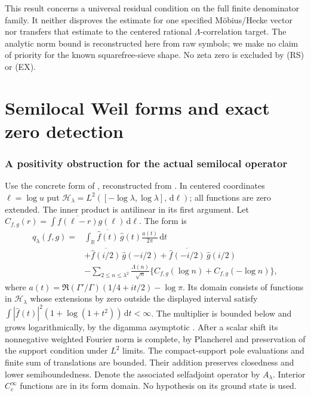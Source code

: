 \documentclass[11pt]{article}
\theoremstyle{remark}\newtheorem{remark}[theorem]{Remark}
\newcommand{\R}{\mathbb R}
\newcommand{\dd}{\,\mathrm d}
\begin{document}
This result concerns a universal residual condition on the full
finite denominator family. It neither disproves the estimate for
one specified M\"obius/Hecke vector nor transfers that estimate
to the centered rational $\Lambda$-correlation target.
The analytic norm bound is reconstructed here from raw symbols;
we make no claim of priority for the known squarefree-sieve
shape. No zeta zero is excluded by (RS) or (EX).

\part{Semilocal Weil forms and exact zero detection}

\section{A positivity obstruction for the actual semilocal operator}
Use the concrete form of \cite[\S3, eqs.~(3.2)--(3.5)]{OperatorSource},
reconstructed from \cite[Proposition 2.1 and Corollary 2.4]{ConnesConsani}.
In centered coordinates $\ell=\log u$ put
$\mathcal H_\lambda=L^2([-\log\lambda,\log\lambda],\dd\ell)$;
all functions are zero extended. The inner product is
antilinear in its first argument. Let
$C_{f,g}(r)=\int\overline{f(\ell-r)}g(\ell)\dd\ell$.
The form is
\begin{align*}
 q_\lambda(f,g)={}&
 \int_{\R}\overline{\widehat f(t)}\,\widehat g(t)
       \frac{a(t)}{2\pi}\dd t\\
 &+\overline{\widehat f(i/2)}\,\widehat g(-i/2)
       +\overline{\widehat f(-i/2)}\,\widehat g(i/2)\\
 &-\sum_{2\le n\le\lambda^2}\frac{\Lambda(n)}{\sqrt n}
       \{C_{f,g}(\log n)+C_{f,g}(-\log n)\},
\end{align*}
where $a(t)=\Re(\Gamma'/\Gamma)(1/4+it/2)-\log\pi$.
Its domain consists of functions in $\mathcal H_\lambda$
whose extensions by zero outside the displayed interval satisfy
$\int|\widehat f(t)|^2(1+\log(1+t^2))\dd t<\infty$.
The multiplier is bounded below and grows logarithmically,
by the digamma asymptotic \cite[eq.~(5.11.2)]{DLMFGamma}.
After a scalar shift its nonnegative weighted Fourier norm
is complete, by Plancherel and preservation of the support
condition under $L^2$ limits. The compact-support pole
evaluations and finite sum of translations are bounded.
Their addition preserves closedness and lower
semiboundedness. Denote the associated selfadjoint operator
by $A_\lambda$. Interior $C_c^\infty$ functions are in its
form domain. No hypothesis on its ground state is used.
\end{document}
